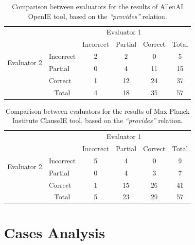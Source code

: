 \documentclass[11pt,a4paper,openright]{memoir}
\begin{document}
\begin{table}[!htbp]
  \centering
\begin{tabular}{l|l|c|c|c|c}
\multicolumn{2}{c}{}&\multicolumn{3}{c}{Evaluator 1}&\\
\cline{3-5}
\multicolumn{2}{c|}{}&Incorrect&Partial&Correct&\multicolumn{1}{c}{Total}\\
\cline{2-5}
\multirow{2}{*}{Evaluator 2}& Incorrect & 2 & 2 & 0 & 5 \\
\cline{2-5}
& Partial & 0 & 4 & 11 & 15 \\
\cline{2-5}
& Correct & 1 & 12 & 24 & 37 \\
\cline{2-5}
\multicolumn{1}{c}{} & \multicolumn{1}{c}{Total} & \multicolumn{1}{c}{4} & \multicolumn{1}{c}{18} & \multicolumn{1}{c}{35} & 57 \\
\end{tabular}

  \caption[Comparison between evaluators for the results of AllenAI OpenIE tool.]{Comparison between evaluators for the results of AllenAI OpenIE tool, based on the \emph{\enquote{provides}} relation.}
  \label{tab:comparison_results_evaluators_allenai}
\end{table}


\begin{table}[!htbp]
  \centering
\begin{tabular}{l|l|c|c|c|c}
\multicolumn{2}{c}{}&\multicolumn{3}{c}{Evaluator 1}&\\
\cline{3-5}
\multicolumn{2}{c|}{}&Incorrect&Partial&Correct&\multicolumn{1}{c}{Total}\\
\cline{2-5}
\multirow{2}{*}{Evaluator 2}& Incorrect & 5 & 4 & 0 & 9 \\
\cline{2-5}
& Partial & 0 & 4 & 3 & 7 \\
\cline{2-5}
& Correct & 1 & 15 & 26 & 41 \\
\cline{2-5}
\multicolumn{1}{c}{} & \multicolumn{1}{c}{Total} & \multicolumn{1}{c}{5} & \multicolumn{1}{c}{23} & \multicolumn{1}{c}{29} & 57 \\
\end{tabular}

  \caption[Comparison between evaluators for the results of Max Planck Institute ClauseIE tool.]{Comparison between evaluators for the results of Max Planck Institute ClauseIE tool, based on the \emph{\enquote{provides}} relation.}
  \label{tab:comparison_results_evaluators_clauseie}
\end{table}

\section{Cases Analysis}
\label{section:cases}
\end{document}
